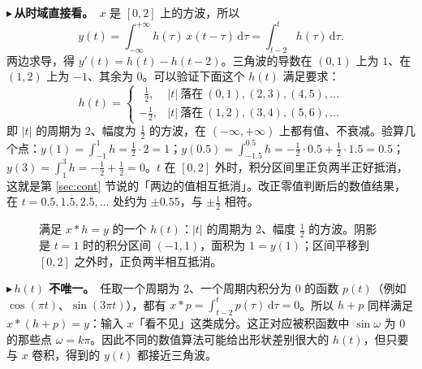 \documentclass[UTF8,a4paper,11pt]{ctexart}
\newcommand{\taxes}[5][t]{%
  \draw[->] (#2,0) -- (#3,0) node[right,font=\scriptsize] {$#1$};
  \draw[->] (0,#5) -- (0,#4);
  \node[anchor=north east,font=\tiny,gray!60!black,inner sep=1pt] at (0,-0.02) {$0$};}
\newcommand{\yt}[2]{\draw (0,#1) -- (-0.1,#1) node[anchor=east,font=\tiny,gray!60!black,fill=white,inner sep=0.6pt] {$#2$};}
\newcounter{ex}[section]
\newcommand{\point}[1]{\par\addvspace{1ex}\noindent\textcolor{ptteal}{$\blacktriangleright$\,\textbf{#1}}\ }
\begin{document}
\point{从时域直接看。}$x$ 是 $[0,2]$ 上的方波，所以
\[
y(t)=\int_{-\infty}^{+\infty}h(\tau)\,x(t-\tau)\,\mathrm{d}\tau=\int_{t-2}^{t}h(\tau)\,\mathrm{d}\tau .
\]
两边求导，得 $y'(t)=h(t)-h(t-2)$。三角波的导数在 $(0,1)$ 上为 $1$、在 $(1,2)$ 上为 $-1$、其余为 $0$。可以验证下面这个 $h(t)$ 满足要求：
\[
h(t)=\begin{cases}\ \ \frac12,& |t|\ \text{落在}\ (0,1),(2,3),(4,5),\dots\\[0.5ex] -\frac12,& |t|\ \text{落在}\ (1,2),(3,4),(5,6),\dots\end{cases}
\]
即 $|t|$ 的周期为 $2$、幅度为 $\frac12$ 的方波，在 $(-\infty,+\infty)$ 上都有值、不衰减。验算几个点：$y(1)=\int_{-1}^{1}h=\frac12\cdot2=1$；$y(0.5)=\int_{-1.5}^{0.5}h=-\frac12\cdot0.5+\frac12\cdot1.5=0.5$；$y(3)=\int_{1}^{3}h=-\frac12+\frac12=0$。$t$ 在 $[0,2]$ 外时，积分区间里正负两半正好抵消，这就是第 \ref{sec:cont} 节说的「两边的值相互抵消」。改正零值判断后的数值结果，在 $t=0.5,1.5,2.5,\dots$ 处约为 $\pm0.55$，与 $\pm\frac12$ 相符。

\begin{figure}[H]
\centering
{}
\caption{满足 $x\ast h=y$ 的一个 $h(t)$：$|t|$ 的周期为 $2$、幅度 $\frac12$ 的方波。阴影是 $t=1$ 时的积分区间 $(-1,1)$，面积为 $1=y(1)$；区间平移到 $[0,2]$ 之外时，正负两半相互抵消。}
\end{figure}

\point{$h(t)$ 不唯一。}任取一个周期为 $2$、一个周期内积分为 $0$ 的函数 $p(t)$（例如 $\cos(\pi t)$、$\sin(3\pi t)$），都有 $x\ast p=\int_{t-2}^{t}p(\tau)\,\mathrm{d}\tau=0$。所以 $h+p$ 同样满足 $x\ast(h+p)=y$：输入 $x$「看不见」这类成分。这正对应被积函数中 $\sin\omega$ 为 $0$ 的那些点 $\omega=k\pi$。因此不同的数值算法可能给出形状差别很大的 $h(t)$，但只要与 $x$ 卷积，得到的 $y(t)$ 都接近三角波。
\end{document}
